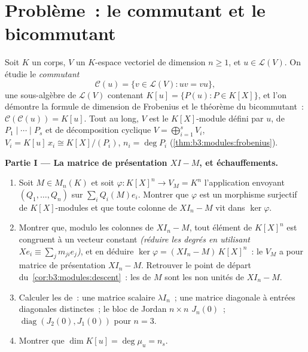 \section{Problème~: le commutant et le bicommutant}

\begin{problem}\label{pb:b3:modules:1}
Soit $K$ un corps, $V$ un $K$-espace vectoriel de dimension $n
\geq 1$, et $u \in \mathcal L(V)$. On étudie le \emph{commutant}
\[
\mathcal C(u) = \{v \in \mathcal L(V) : uv = vu\},
\]
une sous-algèbre de $\mathcal L(V)$ contenant $K[u] = \{P(u) : P
\in K[X]\}$, et l'on démontre la formule de dimension de
Frobenius et le théorème du bicommutant~: $\mathcal C(\mathcal
C(u)) = K[u]$. Tout au long, $V$ est le $K[X]$-module défini par
$u$, de  $P_1 \mid \cdots \mid P_s$ et de
décomposition cyclique $V = \bigoplus_{i=1}^s V_i$, $V_i =
K[u]\,x_i \cong K[X]/(P_i)$, $n_i = \deg P_i$
(\cref{thm:b3:modules:frobenius}).

\medskip
\noindent\textbf{Partie I --- La matrice de présentation $XI -
M$, et échauffements.}
\begin{enumerate}
  \item Soit $M \in M_n(K)$ et soit $\varphi \colon K[X]^n \to
        V_M = K^n$ l'application envoyant $(Q_1, \dots, Q_n)$
        sur $\sum_i Q_i(M)e_i$. Montrer que $\varphi$ est un
        morphisme surjectif de $K[X]$-modules et que toute
        colonne de $XI_n - M$ vit dans $\ker\varphi$.
  \item Montrer que, modulo les colonnes de $XI_n - M$, tout
        élément de $K[X]^n$ est congruent à un vecteur constant
        \emph{(réduire les degrés en utilisant $Xe_i \equiv
        \sum_j m_{ji}e_j$)}, et en déduire $\ker\varphi =
        (XI_n - M)\,K[X]^n$~: le  $V_M$ a pour matrice de
        présentation $XI_n - M$. Retrouver le point de départ
        du~\cref{cor:b3:modules:descent}~: les  de $M$ sont les  non
        unités de $XI_n - M$.
  \item Calculer les  de~: une matrice
        scalaire $\lambda I_n$~; une matrice diagonale à
        entrées diagonales distinctes~; le bloc de Jordan $n
        \times n$ $J_n(0)$~; $\operatorname{diag}(J_2(0),
        J_1(0))$ pour $n = 3$.
  \item Montrer que $\dim K[u] = \deg \mu_u = n_s$.
\end{enumerate}


\end{problem}
